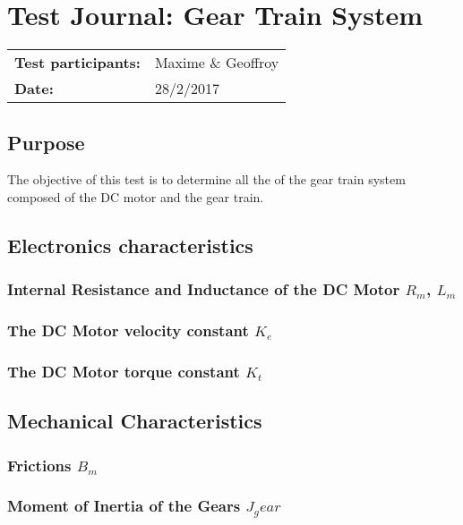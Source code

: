 \graphicspath{{figures/appendix/"Motor&GearTests"/}}
\chapter{Test Journal: Gear Train System}\label{appendix:DCMotorInductance}
\begin{table}[htbp]
\begin{tabular}{l l}
\textbf{Test participants:} & Maxime \& Geoffroy  \\
\textbf{Date:}  & 28/2/2017
\end{tabular}
\end{table}

\section*{Purpose}
The objective of this test is to determine all the of the gear train system composed of the DC motor and the gear train.
\section*{Electronics characteristics}

\subsection*{Internal Resistance and Inductance of the DC Motor $R_m$, $L_m$}


\subsection{The DC Motor velocity constant $K_e$}



\subsection{The DC Motor torque constant $K_t$}


\section{Mechanical Characteristics}

\subsection{Frictions $B_m$}


\subsection{Moment of Inertia of the Gears $J_gear$}




